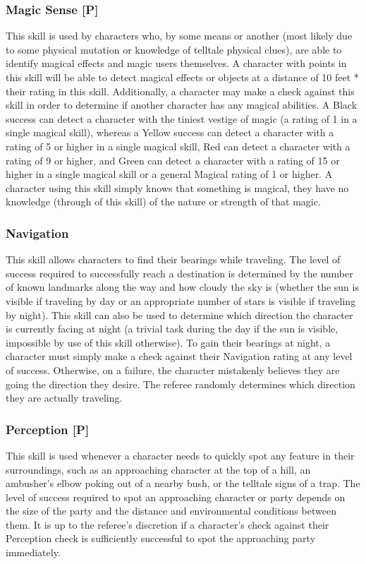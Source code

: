 \documentclass[oneside]{book}
\begin{document}
\begin{multicols}{2}
\subsubsection{Magic Sense [P]}
This skill is used by characters who, by some means or another (most likely due to some physical mutation or knowledge of telltale physical clues), are able to identify magical effects and magic users themselves. A character with points in this skill will be able to detect magical effects or objects at a distance of 10 feet * their rating in this skill. Additionally, a character may make a check against this skill in order to determine if another character has any magical abilities. A Black success can detect a character with the tiniest vestige of magic (a rating of 1 in a single magical skill), whereas a Yellow success can detect a character with a rating of 5 or higher in a single magical skill, Red can detect a character with a rating of 9 or higher, and Green  can detect a character with a rating of 15 or higher in a single magical skill or a general Magical rating of 1 or higher. A character using this skill simply knows that something is magical, they have no knowledge (through of this skill) of the nature or strength of that magic. 

\subsubsection{Navigation}
This skill allows characters to find their bearings while traveling. The level of success required to successfully reach a destination is determined by the number of known landmarks along the way and how cloudy the sky is (whether the sun is visible if traveling by day or an appropriate number of stars is visible if traveling by night). This skill can also be used to determine which direction the character is currently facing at night (a trivial task during the day if the sun is visible, impossible by use of this skill otherwise). To gain their bearings at night, a character must simply make a check against their Navigation rating at any level of success. Otherwise, on a failure, the character mistakenly believes they are going the direction they desire. The referee randomly determines which direction they are actually traveling.

\subsubsection{Perception [P]}
This skill is used whenever a character needs to quickly spot any feature in their surroundings, such as an approaching character at the top of a hill, an ambusher's elbow poking out of a nearby bush, or the telltale signs of a trap. The level of success required to spot an approaching character or party depends on the size of the party and the distance and environmental conditions between them. It is up to the referee's discretion if a character's check against their Perception check is sufficiently successful to spot the approaching party immediately. 


\end{multicols}
\end{document}
